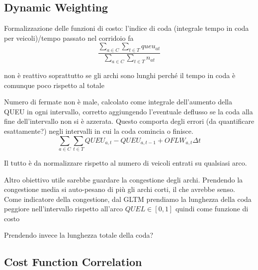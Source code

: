 \subsection{Dynamic Weighting}



Formalizzazione delle funzioni di costo:
l'indice di coda (integrale tempo in coda per veicoli)/tempo passato nel corridoio fa
$$
\frac{\sum_{a \in C} \sum_{t \in T}{queu_{at}}}{\sum_{a \in C} \sum_{t \in T}{n_{at}}}
$$

non è reattivo soprattutto se gli archi sono lunghi perché il tempo in coda è comunque poco rispetto al totale


Numero di fermate non è male, calcolato come integrale dell'aumento della QUEU in ogni intervallo, corretto aggiungendo l'eventuale deflusso se la coda alla fine dell'intervallo non si è azzerata.
Questo comporta degli errori (da quantificare esattamente?) negli intervalli in cui la coda comincia o finisce.
$$
\sum_{a \in C} \sum_{t \in T} QUEU_{a,t} - QUEU_{a,t-1} + OFLW_{a,t} \Delta t
$$

Il tutto è da normalizzare rispetto al numero di veicoli entrati su qualsiasi arco.


Altro obiettivo utile sarebbe guardare la congestione degli archi.
Prendendo la congestione media si auto-pesano di più gli archi corti, il che avrebbe senso.
Come indicatore della congestione, dal GLTM prendiamo la lunghezza della coda peggiore nell'intervallo rispetto all'arco $QUEL\in[0,1]$ quindi come funzione di costo

Prendendo invece la lunghezza totale della coda?


\subsection{Cost Function Correlation}
